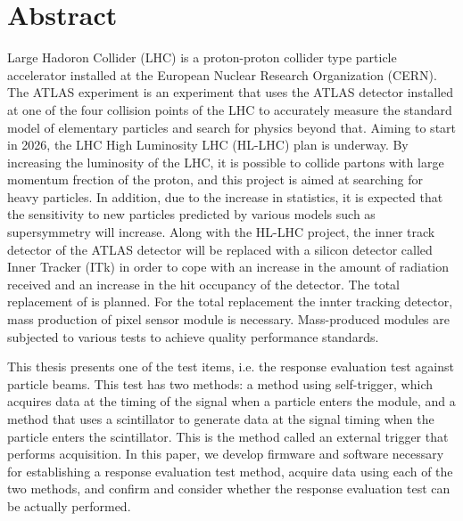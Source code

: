 \chapter*{Abstract}

Large Hadoron Collider (LHC) is a proton-proton collider type particle accelerator installed at the European Nuclear Research Organization (CERN). The ATLAS experiment is an experiment that uses the ATLAS detector installed at one of the four collision points of the LHC to accurately measure the standard model of elementary particles and search for physics beyond that. Aiming to start in 2026, the LHC High Luminosity LHC (HL-LHC) plan is underway. By increasing the luminosity of the LHC, it is possible to collide partons with large momentum frection of the proton, and this project is aimed at searching for heavy particles. In addition, due to the increase in statistics, it is expected that the sensitivity to new particles predicted by various models such as supersymmetry will increase. Along with the HL-LHC project, the inner track detector of the ATLAS detector will be replaced with a silicon detector called Inner Tracker (ITk) in order to cope with an increase in the amount of radiation received and an increase in the hit occupancy of the detector. The total replacement of is planned. For the total replacement the innter tracking detector, mass production of pixel sensor module is necessary. Mass-produced modules are subjected to various tests to achieve quality performance standards.\par
This thesis presents one of the test items, i.e. the response evaluation test against particle beams. This test has two methods: a method using self-trigger, which acquires data at the timing of the signal when a particle enters the module, and a method that uses a scintillator to generate data at the signal timing when the particle enters the scintillator. This is the method called an external trigger that performs acquisition. In this paper, we develop firmware and software necessary for establishing a response evaluation test method, acquire data using each of the two methods, and confirm and consider whether the response evaluation test can be actually performed. 
